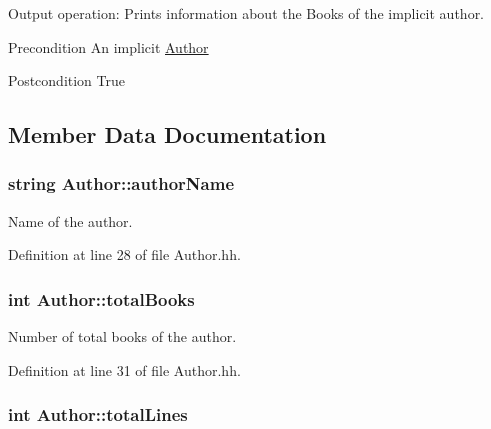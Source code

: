Output operation\+: Prints information about the Books of the implicit author. 

\begin{DoxyPrecond}{Precondition}
An implicit \hyperlink{class_author}{Author} 
\end{DoxyPrecond}
\begin{DoxyPostcond}{Postcondition}
True 
\end{DoxyPostcond}


\subsection{Member Data Documentation}
\subsubsection[{\texorpdfstring{author\+Name}{authorName}}]{\setlength{\rightskip}{0pt plus 5cm}string Author\+::author\+Name\hspace{0.3cm}{\ttfamily [private]}}\hypertarget{class_author_a146b76b89d701097c36fb5d29df27bc4}{}\label{class_author_a146b76b89d701097c36fb5d29df27bc4}


Name of the author. 



Definition at line 28 of file Author.\+hh.

\subsubsection[{\texorpdfstring{total\+Books}{totalBooks}}]{\setlength{\rightskip}{0pt plus 5cm}int Author\+::total\+Books\hspace{0.3cm}{\ttfamily [private]}}\hypertarget{class_author_ac870b8c861aa0f69cd2c4e7b8d414902}{}\label{class_author_ac870b8c861aa0f69cd2c4e7b8d414902}


Number of total books of the author. 



Definition at line 31 of file Author.\+hh.

\subsubsection[{\texorpdfstring{total\+Lines}{totalLines}}]{\setlength{\rightskip}{0pt plus 5cm}int Author\+::total\+Lines\hspace{0.3cm}{\ttfamily [private]}}\hypertarget{class_author_a8d818414bbd909287641b388601bf61a}{}\label{class_author_a8d818414bbd909287641b388601bf61a}


